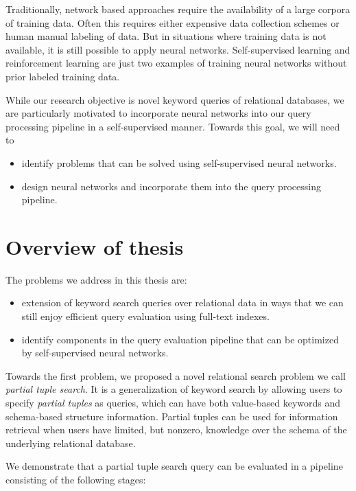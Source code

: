 Traditionally, network based approaches require the availability of a large corpora of training data.  Often this requires either expensive data collection schemes or human manual labeling of data.  But in situations where training data is not available, it is still possible to apply neural networks.  Self-supervised learning and reinforcement learning are just two examples of training neural networks without prior labeled training data.

While our research objective is novel keyword queries of relational databases, we are particularly motivated to incorporate neural networks into our query processing pipeline in a self-supervised manner.  Towards this goal, we will need to

\begin{itemize}
\item identify problems that can be solved using self-supervised neural networks.
\item design neural networks and incorporate them into the query processing pipeline.
\end{itemize}

\section{Overview of thesis}

The problems we address in this thesis are:

\begin{itemize}
\item extension of keyword search queries over relational data in ways that we can still enjoy efficient query evaluation using full-text indexes.

\item identify components in the query evaluation pipeline that can be optimized by self-supervised neural networks.
\end{itemize}

Towards the first problem, we proposed a novel relational search problem we call {\em partial tuple search}.  It is a generalization of keyword search by allowing users to specify {\em partial tuples} as queries, which can have both value-based keywords and schema-based structure information.  Partial tuples can be used for information retrieval when users have limited, but nonzero, knowledge over the schema of the underlying relational database.

We demonstrate that a partial tuple search query can be evaluated in a pipeline consisting of the following stages:

